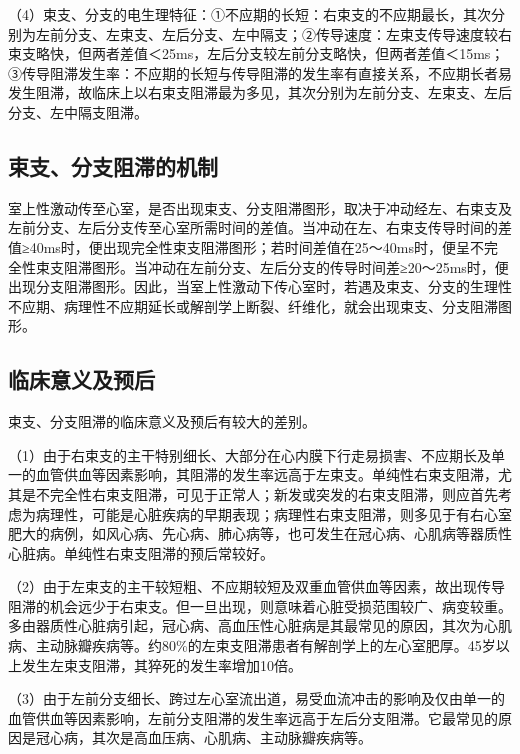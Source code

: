 （4）束支、分支的电生理特征：①不应期的长短：右束支的不应期最长，其次分别为左前分支、左束支、左后分支、左中隔支；②传导速度：左束支传导速度较右束支略快，但两者差值＜25ms，左后分支较左前分支略快，但两者差值＜15ms；③传导阻滞发生率：不应期的长短与传导阻滞的发生率有直接关系，不应期长者易发生阻滞，故临床上以右束支阻滞最为多见，其次分别为左前分支、左束支、左后分支、左中隔支阻滞。

\protect\hypertarget{text00028.htmlux5cux23subid341}{}{}

\subsection{束支、分支阻滞的机制}

室上性激动传至心室，是否出现束支、分支阻滞图形，取决于冲动经左、右束支及左前分支、左后分支传至心室所需时间的差值。当冲动在左、右束支传导时间的差值≥40ms时，便出现完全性束支阻滞图形；若时间差值在25～40ms时，便呈不完全性束支阻滞图形。当冲动在左前分支、左后分支的传导时间差≥20～25ms时，便出现分支阻滞图形。因此，当室上性激动下传心室时，若遇及束支、分支的生理性不应期、病理性不应期延长或解剖学上断裂、纤维化，就会出现束支、分支阻滞图形。

\protect\hypertarget{text00028.htmlux5cux23subid342}{}{}

\subsection{临床意义及预后}

束支、分支阻滞的临床意义及预后有较大的差别。

（1）由于右束支的主干特别细长、大部分在心内膜下行走易损害、不应期长及单一的血管供血等因素影响，其阻滞的发生率远高于左束支。单纯性右束支阻滞，尤其是不完全性右束支阻滞，可见于正常人；新发或突发的右束支阻滞，则应首先考虑为病理性，可能是心脏疾病的早期表现；病理性右束支阻滞，则多见于有右心室肥大的病例，如风心病、先心病、肺心病等，也可发生在冠心病、心肌病等器质性心脏病。单纯性右束支阻滞的预后常较好。

（2）由于左束支的主干较短粗、不应期较短及双重血管供血等因素，故出现传导阻滞的机会远少于右束支。但一旦出现，则意味着心脏受损范围较广、病变较重。多由器质性心脏病引起，冠心病、高血压性心脏病是其最常见的原因，其次为心肌病、主动脉瓣疾病等。约80\%的左束支阻滞患者有解剖学上的左心室肥厚。45岁以上发生左束支阻滞，其猝死的发生率增加10倍。

（3）由于左前分支细长、跨过左心室流出道，易受血流冲击的影响及仅由单一的血管供血等因素影响，左前分支阻滞的发生率远高于左后分支阻滞。它最常见的原因是冠心病，其次是高血压病、心肌病、主动脉瓣疾病等。

